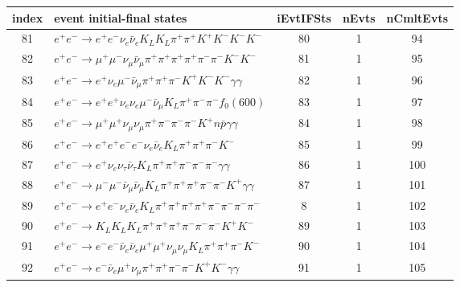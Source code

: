 \documentclass[landscape]{article}
\begin{document}
\clearpage

\begin{table}[htbp!]
\small
\centering
\begin{tabular}{|c|>{\centering}p{18cm}|c|c|c|}
\hline
index & event initial-final states & iEvtIFSts & nEvts & nCmltEvts \\
\hline
81 & $ e^{+} e^{-} \rightarrow e^{+} e^{-} \nu_{e} \bar{\nu}_{e} K_{L} K_{L} \pi^{+} \pi^{+} K^{+} K^{-} K^{-} K^{-} $ & 80 & 1 & 94 \\
\hline
82 & $ e^{+} e^{-} \rightarrow \mu^{+} \mu^{-} \nu_{\mu} \bar{\nu}_{\mu} \pi^{+} \pi^{+} \pi^{+} \pi^{+} \pi^{-} \pi^{-} K^{-} K^{-} $ & 81 & 1 & 95 \\
\hline
83 & $ e^{+} e^{-} \rightarrow e^{+} \nu_{e} \mu^{-} \bar{\nu}_{\mu} \pi^{+} \pi^{+} \pi^{-} K^{+} K^{-} K^{-} \gamma \gamma $ & 82 & 1 & 96 \\
\hline
84 & $ e^{+} e^{-} \rightarrow e^{+} e^{+} \nu_{e} \nu_{e} \mu^{-} \bar{\nu}_{\mu} K_{L} \pi^{+} \pi^{-} \pi^{-} f_{0}(600) $ & 83 & 1 & 97 \\
\hline
85 & $ e^{+} e^{-} \rightarrow \mu^{+} \mu^{+} \nu_{\mu} \nu_{\mu} \pi^{+} \pi^{-} \pi^{-} \pi^{-} K^{+} n \bar{p} \gamma \gamma $ & 84 & 1 & 98 \\
\hline
86 & $ e^{+} e^{-} \rightarrow e^{+} e^{+} e^{-} e^{-} \nu_{e} \bar{\nu}_{e} K_{L} \pi^{+} \pi^{+} \pi^{-} K^{-} $ & 85 & 1 & 99 \\
\hline
87 & $ e^{+} e^{-} \rightarrow e^{+} \nu_{e} \nu_{\tau} \bar{\nu}_{\tau} K_{L} \pi^{+} \pi^{+} \pi^{-} \pi^{-} \pi^{-} \gamma \gamma $ & 86 & 1 & 100 \\
\hline
88 & $ e^{+} e^{-} \rightarrow \mu^{-} \mu^{-} \bar{\nu}_{\mu} \bar{\nu}_{\mu} K_{L} \pi^{+} \pi^{+} \pi^{+} \pi^{-} \pi^{-} K^{+} \gamma \gamma $ & 87 & 1 & 101 \\
\hline
89 & $ e^{+} e^{-} \rightarrow e^{+} e^{-} \nu_{e} \bar{\nu}_{e} K_{L} \pi^{+} \pi^{+} \pi^{+} \pi^{+} \pi^{-} \pi^{-} \pi^{-} \pi^{-} $ & 8 & 1 & 102 \\
\hline
90 & $ e^{+} e^{-} \rightarrow K_{L} K_{L} K_{L} \pi^{+} \pi^{+} \pi^{+} \pi^{-} \pi^{-} \pi^{-} K^{+} K^{-} $ & 89 & 1 & 103 \\
\hline
91 & $ e^{+} e^{-} \rightarrow e^{-} e^{-} \bar{\nu}_{e} \bar{\nu}_{e} \mu^{+} \mu^{+} \nu_{\mu} \nu_{\mu} K_{L} \pi^{+} \pi^{+} \pi^{-} K^{-} $ & 90 & 1 & 104 \\
\hline
92 & $ e^{+} e^{-} \rightarrow e^{-} \bar{\nu}_{e} \mu^{+} \nu_{\mu} \pi^{+} \pi^{+} \pi^{-} \pi^{-} K^{+} K^{-} \gamma \gamma $ & 91 & 1 & 105 \\

\end{tabular}
\end{table}
\end{document}
